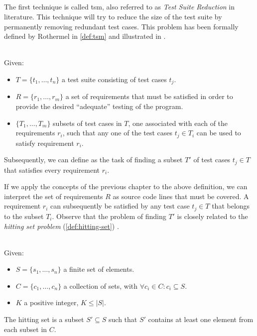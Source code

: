 
\subsection{\tsm{}}
\label{ssec:tsm}
The first technique is called \acrfull{tsm}, also referred to as \emph{Test Suite Reduction} in literature. This technique will try to reduce the size of the test suite by permanently removing redundant test cases. This problem has been formally defined by Rothermel \cite{10.1002/stv.430} in \cref{def:tsm} and illustrated in .

\begin{definition}[\tsm{}]
\label{def:tsm}
\mbox{}\\Given:
\begin{itemize}
	\item $T = \{t_1, \dots, t_n\}$ a test suite consisting of test cases $t_j$.
	\item $R = \{r_1, \dots, r_m\}$ a set of requirements that must be satisfied in order to provide the desired ``adequate'' testing of the program.
	\item $\{T_1, \dots, T_m\}$ subsets of test cases in $T$, one associated with each of the requirements $r_i$, such that any one of the test cases $t_j \in T_i$ can be used to satisfy requirement $r_i$.
\end{itemize}

\noindent Subsequently, we can define \tsm{} as the task of finding a subset $T'$ of test cases $t_j \in T$ that satisfies every requirement $r_i$.
\end{definition}

\noindent If we apply the concepts of the previous chapter to the above definition, we can interpret the set of requirements $R$ as source code lines that must be covered. A requirement $r_i$ can subsequently be satisfied by any test case $t_j \in T$ that belongs to the subset $T_i$. Observe that the problem of finding $T'$ is closely related to the \emph{hitting set problem} (\cref{def:hitting-set}) \cite{10.1002/stv.430}.

\begin{definition}
\label{def:hitting-set}
\mbox{}\\Given:
\begin{itemize}
	\item $S = \{s_1, \dots, s_n\}$ a finite set of elements.
	\item $C = \{c_1, \dots, c_n\}$ a collection of sets, with $\forall c_i \in C : c_i \subseteq S$.
	\item $K$ a positive integer, $K \le |S|$.
\end{itemize}

\noindent The hitting set is a subset $S' \subseteq S$ such that $S'$ contains at least one element from each subset in $C$.
\end{definition}

